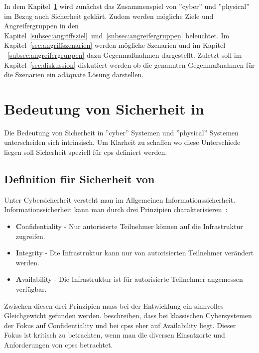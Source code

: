 \documentclass[final,bibliography=totocnumbered]{include/sikseminar}
\newcommand{\fb}[1]{\dofb#1}
\newcommand{\dofb}[1]{\textbf{#1}\nobreak\hspace{0pt}}
\begin{document}
In dem Kapitel~\ref{sec:bedeutung-sicherheit} wird zunächst das Zusammenspiel von ''cyber'' und ''physical'' im Bezug auch Sicherheit geklärt.
Zudem werden mögliche Ziele und Angreifergruppen in den Kapitel~\ref{subsec:angriffsziel}~und~\ref{subsec:angreifergruppen} beleuchtet.
Im Kapitel~\ref{sec:angriffszenarien} werden mögliche Szenarien und im Kapitel ~\ref{subsec:angreifergruppen} dazu Gegenmaßnahmen dargestellt.
Zuletzt soll im Kapitel~\ref{sec:diskussion} diskutiert werden ob die genannten Gegenmaßnahmen  für die Szenarien ein adäquate Lösung darstellen.



\section{Bedeutung von Sicherheit in }\label{sec:bedeutung-sicherheit}
Die Bedeutung von Sicherheit in ''cyber'' Systemen und ''physical'' Systemen unterscheiden sich intrinsisch.
Um Klarheit zu schaffen wo diese Unterschiede liegen soll Sicherheit speziell für \gls{cps} definiert werden.

\subsection{Definition für Sicherheit von }\label{subsec:definition}
Unter Cybersicherheit versteht man im Allgemeinen Informationssicherheit.
Informationssicherheit kann man durch drei Prinzipien charakterisieren~\cite[,S.~2]{Cherdantseva2013,SFJ2017}:
\begin{itemize}[noitemsep,nolistsep]
\item \fb{Confidentiality} - Nur autorisierte Teilnehmer können auf die Infrastruktur zugreifen.
\item \fb{Integrity} - Die Infrastruktur kann nur von autorisierten Teilnehmer verändert werden.
\item \fb{Availability} - Die Infrastruktur ist für autorisierte Teilnehmer angemessen verfügbar.
\end{itemize}
Zwischen diesen drei Prinzipien muss bei der Entwicklung ein sinnvolles Gleichgewicht gefunden werden.
\citeauthor{GK16} beschreiben, dass bei klassischen Cybersystemen der Fokus auf Confidentiality und bei \glspl{cps} eher auf Availability liegt.
Dieser Fokus ist kritisch zu betrachten, wenn man die diversen Einsatzorte und Anforderungen von \glspl{cps} betrachtet.
\end{document}
